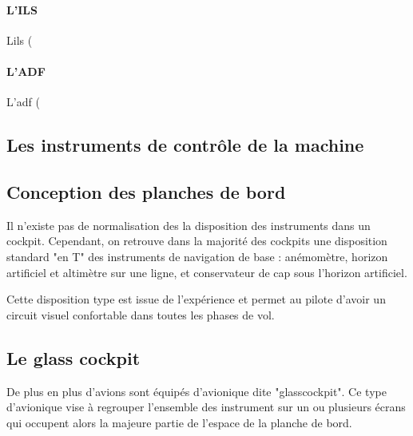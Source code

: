 	\paragraph{L'ILS}
	L\acrshort{ils} (
	
	\begin{figure}[H]	
	\centering
	\end{figure}
	
	\paragraph{L'ADF}
	L'\acrshort{adf} (
	
	\subsection{Les instruments de contrôle de la machine}
	
	\subsection{Conception des planches de bord}
	Il n'existe pas de normalisation des la disposition des instruments dans un cockpit. Cependant, on retrouve dans la majorité des cockpits une disposition standard "en T" des instruments de navigation de base : anémomètre, horizon artificiel et altimètre sur une ligne, et conservateur de cap sous l'horizon artificiel.
	
	\begin{figure}[H]	
	\centering
	\end{figure}
	
	Cette disposition type est issue de l'expérience et permet au pilote d'avoir un circuit visuel confortable dans toutes les phases de vol.
	
	\subsection{Le glass cockpit}
	
	De plus en plus d'avions sont équipés d'avionique dite "\gls{glasscockpit}". Ce type d'avionique vise à regrouper l'ensemble des instrument sur un ou plusieurs écrans qui occupent alors la majeure partie de l'espace de la planche de bord.
	
